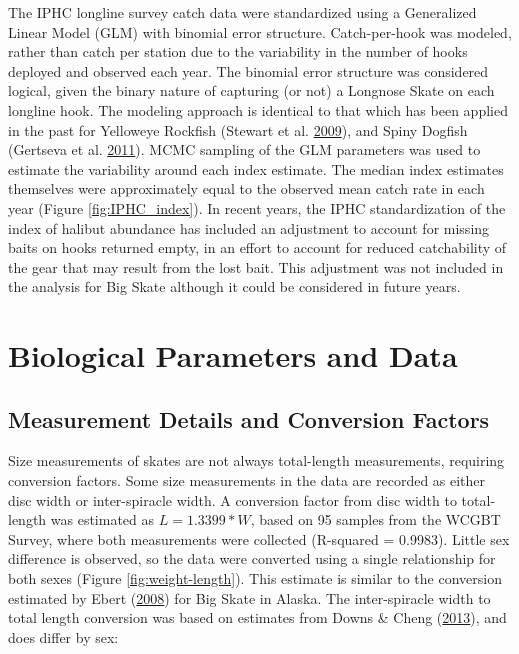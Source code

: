 \documentclass[12pt,]{article}
\begin{document}
The IPHC longline survey catch data were standardized using a
Generalized Linear Model (GLM) with binomial error structure.
Catch-per-hook was modeled, rather than catch per station due to the
variability in the number of hooks deployed and observed each year. The
binomial error structure was considered logical, given the binary nature
of capturing (or not) a Longnose Skate on each longline hook. The
modeling approach is identical to that which has been applied in the
past for Yelloweye Rockfish (Stewart et al.
\protect\hyperlink{ref-Stewart2009}{2009}), and Spiny Dogfish (Gertseva
et al. \protect\hyperlink{ref-Gertseva2011}{2011}). MCMC sampling of the
GLM parameters was used to estimate the variability around each index
estimate. The median index estimates themselves were approximately equal
to the observed mean catch rate in each year (Figure
\ref{fig:IPHC_index}). In recent years, the IPHC standardization of the
index of halibut abundance has included an adjustment to account for
missing baits on hooks returned empty, in an effort to account for
reduced catchability of the gear that may result from the lost bait.
This adjustment was not included in the analysis for Big Skate although
it could be considered in future years. \newpage

\hypertarget{biological-parameters-and-data}{%
\section{Biological Parameters and
Data}\label{biological-parameters-and-data}}

\hypertarget{measurement-details-and-conversion-factors}{%
\subsection{Measurement Details and Conversion
Factors}\label{measurement-details-and-conversion-factors}}

Size measurements of skates are not always total-length measurements,
requiring conversion factors. Some size measurements in the data are
recorded as either disc width or inter-spiracle width. A conversion
factor from disc width to total-length was estimated as
\(L = 1.3399 * W\), based on 95 samples from the WCGBT Survey, where
both measurements were collected (R-squared = 0.9983). Little sex
difference is observed, so the data were converted using a single
relationship for both sexes (Figure \ref{fig:weight-length}). This
estimate is similar to the conversion estimated by Ebert
(\protect\hyperlink{ref-Ebert2008}{2008}) for Big Skate in Alaska. The
inter-spiracle width to total length conversion was based on estimates
from Downs \& Cheng (\protect\hyperlink{ref-Downs2013}{2013}), and does
differ by sex:
\end{document}
